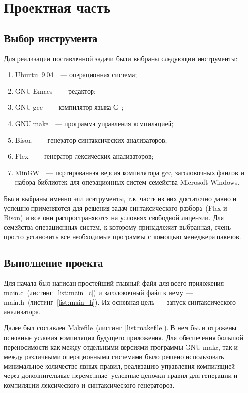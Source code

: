 
\section{Проектная часть}
\label{sec:project}

\subsection{Выбор инструмента}
\label{sec:utils}

Для реализации поставленной задачи были выбраны следующии инструменты:
\begin{enumerate}
\item Ubuntu~9.04~\cite{ubuntu_home}~--- операционная система;
\item GNU Emacs~\cite{emacs_home}~--- редактор;
\item GNU gcc~\cite{gcc,gcc_home}~--- компилятор языка С~\cite{k_r_c};
\item GNU make~\cite{make,make_home}~--- программа управления
  компиляцией;
\item Bison~\cite{bison,bison_home}~--- генератор синтаксических
  анализаторов;
\item Flex~\cite{lex,flex_home}~--- генератор лексических
  анализаторов;
\item MinGW~\cite{mingw}~--- портированная версия компилятора gcс,
  заголовочных файлов и набора библиотек для операционных систем
  семейства Microsoft Windows.
\end{enumerate}
Были выбраны именно эти иснтрументы, т.к. часть из них достаточно
давно и успешно применяются для решения задач синтаксического
разбора~(Flex и Bison) и все они распространяются на условиях
свободной лицензии.  Для семейства операционных систем, к которому
принадлежит выбранная, очень просто установить все необходимые
программы с помощью менеджера пакетов.

\subsection{Выполнение проекта}
\label{sec:execute}

Для начала был написан простейший главный файл для всего
приложения~--- main.c~(листинг~\ref{list:main_c}) и заголовочный файл
к нему~--- main.h~(листинг~\ref{list:main_h}).  Их основная цель~---
запуск синтаксического анализатора.

Далее был составлен Makefile~(листинг~\ref{list:makefile}).  В нем
были отражены основные условия компиляции будущего приложения.  Для
обеспечения большой переносимости как между отдельными версиями
программы GNU make, так и между различными операционными системами
было решено использовать минимальное количество явных правил,
реализацию управления компиляцией через дополнительные переменные,
условные цепочки правил для генерации и компиляции лексического и
синтаксического генераторов.

